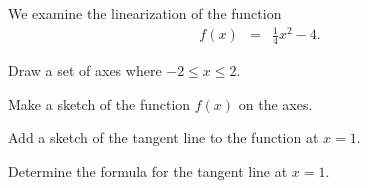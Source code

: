 \begin{problem} 
\item We examine the linearization of the function
  \begin{eqnarray*}
    f(x) & = & \frac{1}{4}x^2-4.
  \end{eqnarray*}
  \begin{subproblem}
  \item Draw a set of axes where $-2\leq x \leq 2$. 


    \vfill

  \item Make a sketch of the function $f(x)$ on the axes.
  \item Add a sketch of the tangent line to the function at $x=1$.
  \item Determine the formula for the tangent line at $x=1$.
    \vfill

  \end{subproblem}
\end{problem}


